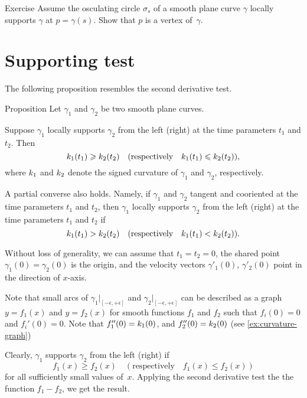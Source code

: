 \begin{thm}{Exercise}\label{ex:vertex-support}
Assume the osculating circle $\sigma_s$ of a smooth plane curve $\gamma$ locally supports $\gamma$ at $p=\gamma(s)$.
Show that $p$ is a vertex of~$\gamma$.
\end{thm}

\section{Supporting test}

The following proposition resembles the second derivative test. 

\begin{thm}{Proposition}\label{prop:supporting-circline}
Let $\gamma_1$ and $\gamma_2$ be two smooth plane curves.

Suppose $\gamma_1$ locally supports $\gamma_2$ from the left (right) at the time parameters $t_1$ and $t_2$.
Then 
\[k_1(t_1)\geqslant k_2(t_2)\quad(\text{respectively}\quad k_1(t_1)\leqslant k_2(t_2)),\]
where $k_1$ and $k_2$ denote the signed curvature of $\gamma_1$ and $\gamma_2$, respectively.

A partial converse also holds.
Namely, if $\gamma_1$ and $\gamma_2$ tangent and cooriented at the time parameters $t_1$ and $t_2$,
then $\gamma_1$ locally supports $\gamma_2$ from the left (right) at the time parameters $t_1$ and $t_2$
if 
\[k_1(t_1)> k_2(t_2)\quad(\text{respectively}\quad k_1(t_1)< k_2(t_2)).\]

\end{thm}

 Without loss of generality, we can assume that $t_1=t_2=0$, the shared point $\gamma_1(0)=\gamma_2(0)$ is the origin, and the velocity vectors $\gamma'_1(0)$, $\gamma'_2(0)$ point in the direction of $x$-axis.

Note that small arcs of $\gamma_1|_{[-\epsilon,+\epsilon]}$ and  $\gamma_2|_{[-\epsilon,+\epsilon]}$ can be described as a graph 
$y=f_1(x)$ and $y=f_2(x)$ for smooth functions $f_1$ and $f_2$ such that $f_i(0)=0$ and $f_i'(0)=0$.
Note that $f_1''(0)=k_1(0)$, and $f_2''(0)=k_2(0)$ (see \ref{ex:curvature-graph})

Clearly, $\gamma_1$ supports $\gamma_2$ from the left (right) if 
\[f_1(x)\ge f_2(x)\quad(\text{respectively}\quad f_1(x)\le f_2(x))\]
for all sufficiently small values of~$x$.
Applying the second derivative test the the function $f_1-f_2$, we get the result.
\qeds


